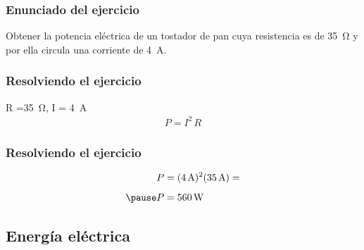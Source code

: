 \documentclass[14pt]{beamer}
\begin{document}
\begin{frame}
\frametitle{Enunciado del ejercicio}
Obtener la potencia eléctrica de un tostador de pan cuya resistencia es de \SI{35}{\ohm} y por ella circula una
corriente de \SI{4}{\ampere}.
\end{frame}
\begin{frame}
\frametitle{Resolviendo el ejercicio}
 \pause R =\SI{35}{\ohm}, \quad I = \SI{4}{\ampere}
\\
\bigskip
\pause
{}
\begin{align*}
P = I^{2} \, R
\end{align*} 
\end{frame}
\begin{frame}
\frametitle{Resolviendo el ejercicio}
\begin{eqnarray*}
\begin{aligned}
P &= (\SI{4}{\ampere})^{2} (\SI{35}{\ampere}) = \\[0.5em] \pause
P &= \SI{560}{\watt} 
\end{aligned}
\end{eqnarray*}
\end{frame}


\subsection{Energía eléctrica}
\end{document}
